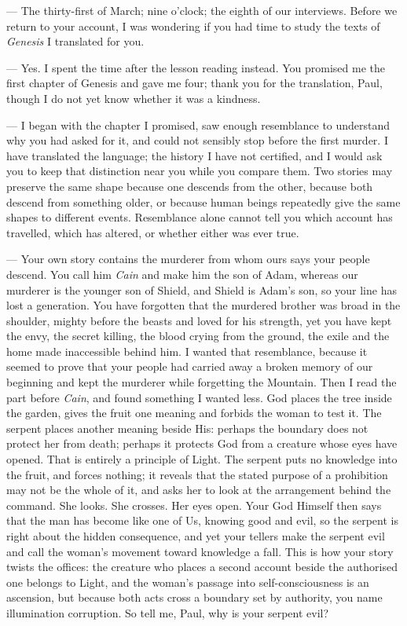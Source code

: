 
\begin{room}


--- The thirty-first of March; nine o'clock; the eighth of our interviews. Before we return to your account, I was wondering if you had time to study the texts of \textit{Genesis} I translated for you.

--- Yes. I spent the time after the lesson reading instead. You promised me the first chapter of Genesis and gave me four; thank you for the translation, Paul, though I do not yet know whether it was a kindness.

--- I began with the chapter I promised, saw enough resemblance to understand why you had asked for it, and could not sensibly stop before the first murder. I have translated the language; the history I have not certified, and I would ask you to keep that distinction near you while you compare them. Two stories may preserve the same shape because one descends from the other, because both descend from something older, or because human beings repeatedly give the same shapes to different events. Resemblance alone cannot tell you which account has travelled, which has altered, or whether either was ever true.

--- Your own story contains the murderer from whom ours says your people descend. You call him \textit{Cain} and make him the son of Adam, whereas our murderer is the younger son of Shield, and Shield is Adam's son, so your line has lost a generation. You have forgotten that the murdered brother was broad in the shoulder, mighty before the beasts and loved for his strength, yet you have kept the envy, the secret killing, the blood crying from the ground, the exile and the home made inaccessible behind him. I wanted that resemblance, because it seemed to prove that your people had carried away a broken memory of our beginning and kept the murderer while forgetting the Mountain. Then I read the part before \textit{Cain}, and found something I wanted less. God places the tree inside the garden, gives the fruit one meaning and forbids the woman to test it. The serpent places another meaning beside His: perhaps the boundary does not protect her from death; perhaps it protects God from a creature whose eyes have opened. That is entirely a principle of Light. The serpent puts no knowledge into the fruit, and forces nothing; it reveals that the stated purpose of a prohibition may not be the whole of it, and asks her to look at the arrangement behind the command. She looks. She crosses. Her eyes open. Your God Himself then says that the man has become like one of Us, knowing good and evil, so the serpent is right about the hidden consequence, and yet your tellers make the serpent evil and call the woman's movement toward knowledge a fall. This is how your story twists the offices: the creature who places a second account beside the authorised one belongs to Light, and the woman's passage into self-consciousness is an ascension, but because both acts cross a boundary set by authority, you name illumination corruption. So tell me, Paul, why is your serpent evil?


\end{room}
